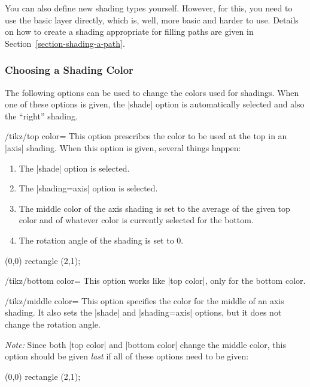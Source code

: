 You can also define new shading types yourself. However, for this, you
need to use the basic layer directly, which is, well, more basic and
harder to use. Details on how to create a shading appropriate for
filling paths are given in Section~\ref{section-shading-a-path}.



\subsubsection{Choosing a Shading Color}

The following options can be used to change the colors used for
shadings. When one of these options is given, the |shade| option is
automatically selected and also the ``right'' shading.

\begin{key}{/tikz/top color=}
  This option prescribes the color to be used at the top in an |axis|
  shading. When this option is given, several things happen:
  \begin{enumerate}
  \item
    The |shade| option is selected.
  \item
    The |shading=axis| option is selected.
  \item
    The middle color of the axis shading is set to the average of the
    given top color  and of whatever color is currently
    selected for the bottom.
  \item
    The rotation angle of the shading is set to 0.
  \end{enumerate}

\begin{codeexample}[]
\tikz \draw[top color=red] (0,0) rectangle (2,1);
\end{codeexample}
\end{key}  

\begin{key}{/tikz/bottom color=}
  This option works like |top color|, only for the bottom color.
\end{key}

\begin{key}{/tikz/middle color=}
  This option specifies the color for the middle of an axis
  shading. It also sets the |shade| and |shading=axis| options, but it
  does not change the rotation angle.

  \emph{Note:} Since both |top color| and |bottom color| change the
  middle color, this option should be given \emph{last} if all of
  these options need to be given:

\begin{codeexample}[]
\tikz \draw[top color=white,bottom color=black,middle color=red]
  (0,0) rectangle (2,1);
\end{codeexample}  
\end{key}

